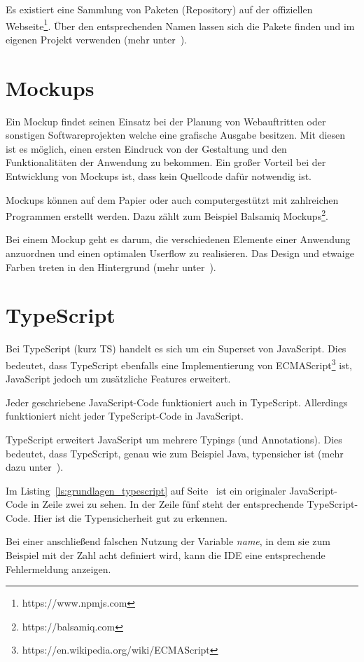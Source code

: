 Es existiert eine Sammlung von Paketen (Repository) auf der offiziellen Webseite\footnote{https://www.npmjs.com}. Über
den entsprechenden Namen lassen sich die Pakete finden und im eigenen Projekt verwenden
(mehr unter~\cite{book_grundlagen_npm}).

\section{Mockups}
Ein Mockup findet seinen Einsatz bei der Planung von Webauftritten oder sonstigen Softwareprojekten welche eine
grafische Ausgabe besitzen. Mit diesen ist es möglich, einen ersten Eindruck von der Gestaltung und den Funktionalitäten
der Anwendung zu bekommen. Ein großer Vorteil bei der Entwicklung von Mockups ist, dass kein Quellcode dafür notwendig
ist.

Mockups können auf dem Papier oder auch computergestützt mit zahlreichen Programmen erstellt werden. Dazu zählt zum
Beispiel Balsamiq Mockups\footnote{https://balsamiq.com}.

Bei einem Mockup geht es darum, die verschiedenen Elemente einer Anwendung anzuordnen und einen optimalen Userflow
zu realisieren. Das Design und etwaige Farben treten in den Hintergrund (mehr unter~\cite{book_grundlagen_mockups}).

\section{TypeScript}
Bei TypeScript (kurz TS) handelt es sich um ein Superset von JavaScript. Dies bedeutet, dass TypeScript ebenfalls eine
Implementierung von ECMAScript\footnote{https://en.wikipedia.org/wiki/ECMAScript} ist, JavaScript jedoch um zusätzliche
Features erweitert.

Jeder geschriebene JavaScript-Code funktioniert auch in TypeScript. Allerdings funktioniert nicht jeder TypeScript-Code
in JavaScript.

TypeScript erweitert JavaScript um mehrere Typings (und Annotations). Dies bedeutet, dass TypeScript, genau wie zum
Beispiel Java, typensicher ist (mehr dazu unter~\cite{book_grundlagen_typescript}).

Im Listing~\ref{ls:grundlagen_typescript} auf Seite~\pageref{ls:grundlagen_typescript} ist ein originaler
JavaScript-Code in Zeile zwei zu sehen. In der Zeile fünf steht der entsprechende TypeScript-Code. Hier ist die
Typensicherheit gut zu erkennen.

Bei einer anschließend falschen Nutzung der Variable \textit{name}, in dem sie zum Beispiel mit der Zahl acht definiert
wird, kann die IDE eine entsprechende Fehlermeldung anzeigen.

